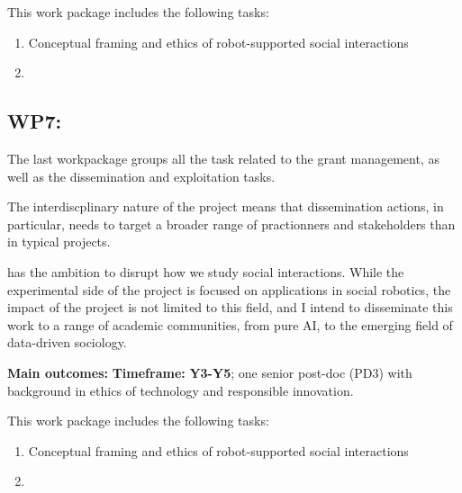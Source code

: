 This work package includes the following tasks:

\begin{enumerate}[label=\textbf{T6.\arabic*}]
    \item Conceptual framing and ethics of robot-supported social
interactions
    \item {}
\end{enumerate}

\subsection{WP7: \textbf{\wpSeven}}

The last workpackage groups all the task related to the grant management, as
well as the dissemination and exploitation tasks.

The interdiscplinary nature of the project means that dissemination actions, in
particular, needs to target a broader range of practionners and stakeholders
than in typical projects.

\project has the ambition to disrupt how we study social interactions. While the
experimental side of the project is focused on applications in social robotics,
the impact of the project is not limited to this field, and I intend to
disseminate this work to a range of academic communities, from pure AI, to the
emerging field of data-driven sociology.


\begin{framed}
    \textbf{Main outcomes:} 
    \textbf{Timeframe:} \textbf{Y3-Y5}; one senior post-doc (PD3)
with background in ethics of technology and responsible innovation.
\end{framed}

This work package includes the following tasks:

\begin{enumerate}[label=\textbf{T6.\arabic*}]
    \item Conceptual framing and ethics of robot-supported social
interactions
    \item {}
\end{enumerate}


\newpage

\printbibliography



